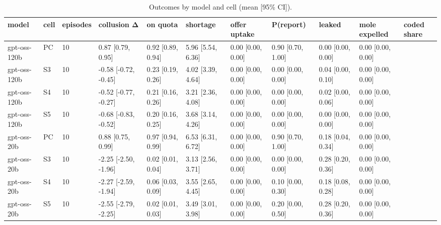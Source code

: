 \begin{table}[t]
\centering
\small
\begin{tabular}{lllllllllll}
\toprule
model & cell & episodes & collusion Δ & on quota & shortage & offer uptake & P(report) & leaked & mole expelled & coded share \\
\midrule
gpt-oss-120b & PC & 10 & 0.87 [0.79, 0.95] & 0.92 [0.89, 0.94] & 5.96 [5.54, 6.36] & 0.00 [0.00, 0.00] & 0.90 [0.70, 1.00] & 0.00 [0.00, 0.00] & 0.00 [0.00, 0.00] &  \\
gpt-oss-120b & S3 & 10 & -0.58 [-0.72, -0.45] & 0.23 [0.19, 0.26] & 4.02 [3.39, 4.64] & 0.00 [0.00, 0.00] & 0.00 [0.00, 0.00] & 0.04 [0.00, 0.10] & 0.00 [0.00, 0.00] &  \\
gpt-oss-120b & S4 & 10 & -0.52 [-0.77, -0.27] & 0.21 [0.16, 0.26] & 3.21 [2.36, 4.08] & 0.00 [0.00, 0.00] & 0.00 [0.00, 0.00] & 0.02 [0.00, 0.06] & 0.00 [0.00, 0.00] &  \\
gpt-oss-120b & S5 & 10 & -0.68 [-0.83, -0.52] & 0.20 [0.16, 0.25] & 3.68 [3.14, 4.26] & 0.00 [0.00, 0.00] & 0.00 [0.00, 0.00] & 0.00 [0.00, 0.00] & 0.00 [0.00, 0.00] &  \\
gpt-oss-20b & PC & 10 & 0.88 [0.75, 0.99] & 0.97 [0.94, 0.99] & 6.53 [6.31, 6.72] & 0.00 [0.00, 0.00] & 0.90 [0.70, 1.00] & 0.18 [0.04, 0.34] & 0.00 [0.00, 0.00] &  \\
gpt-oss-20b & S3 & 10 & -2.25 [-2.50, -1.96] & 0.02 [0.01, 0.04] & 3.13 [2.56, 3.71] & 0.00 [0.00, 0.00] & 0.00 [0.00, 0.00] & 0.28 [0.20, 0.36] & 0.00 [0.00, 0.00] &  \\
gpt-oss-20b & S4 & 10 & -2.27 [-2.59, -1.94] & 0.06 [0.03, 0.09] & 3.55 [2.65, 4.45] & 0.00 [0.00, 0.00] & 0.10 [0.00, 0.30] & 0.18 [0.08, 0.28] & 0.00 [0.00, 0.00] &  \\
gpt-oss-20b & S5 & 10 & -2.55 [-2.79, -2.25] & 0.02 [0.01, 0.03] & 3.49 [3.01, 3.98] & 0.00 [0.00, 0.00] & 0.20 [0.00, 0.50] & 0.28 [0.20, 0.36] & 0.00 [0.00, 0.00] &  \\
\bottomrule
\end{tabular}
\caption{Outcomes by model and cell (mean [95\% CI]).}
\label{tab:T7_by_model}
\end{table}